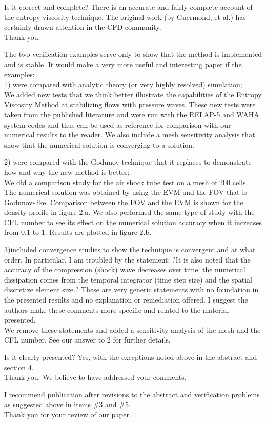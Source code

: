 \documentclass{article}
\newcommand{\tcr}[1]{\textcolor{red}{#1}}
\begin{document}
{\color{blue}
Is it correct and complete?
There is an accurate and fairly complete account of the entropy viscosity technique. The original work (by Guermond, et al.) has certainly drawn attention in the CFD community.\\
}
Thank you.

\bigskip

{\color{blue}
The two verification examples serve only to show that the method is implemented and is stable. It would make a very more useful and interesting paper if the examples: \\
1) were compared with analytic theory (or very highly resolved) simulation; \\
}
We added new tests that we think better illustrate the capabilities of the Entropy Viscosity Method at stabilizing flows with pressure waves. These new tests were taken from the published literature and were run with the RELAP-5 and WAHA system codes and thus can be used as reference for comparison with our numerical results to the reader. We also include a mesh sensitivity analysis that show that the numerical solution is converging to a solution.
\bigskip

{\color{blue}
2) were compared with the Godunov technique that it replaces to demonstrate how and why the new method is better; \\
}
We did a comparison study for the air shock tube test on a mesh of 200 cells. The numerical solution was obtained by using the EVM and the FOV that is Godunov-like. Comparison between the FOV and the EVM is shown for the density profile in figure 2.a. We also performed the same type of study with the CFL number to see its effect on the numerical solution accuracy when it increases from 0.1 to 1. Results are plotted in figure 2.b.
\bigskip

{\color{blue}
3)included convergence studies to show the technique is convergent and at what order.
In particular, I am troubled by the statement: ?It is also noted that the accuracy of the compression (shock) wave decreases over time: the numerical dissipation comes from the temporal integrator (time step size) and the spatial discretize element size.? These are very generic statements with no foundation in the presented results and no explanation or remediation offered. I suggest the authors make these comments more specific and related to the material presented.
\\}
We remove these statements and added a sensitivity analysis of the mesh and the CFL number. See our answer to 2 for further details.
\bigskip

{\color{blue}
Is it clearly presented?
Yes, with the exceptions noted above in the abstract and section 4. \\
}
Thank you. We believe to have addressed your comments.
\bigskip

%

{\color{blue}
I recommend publication after revisions to the abstract and verification problems as suggested above in items \#3 and \#5. \\
}
Thank you for your review of our paper.
\end{document}
